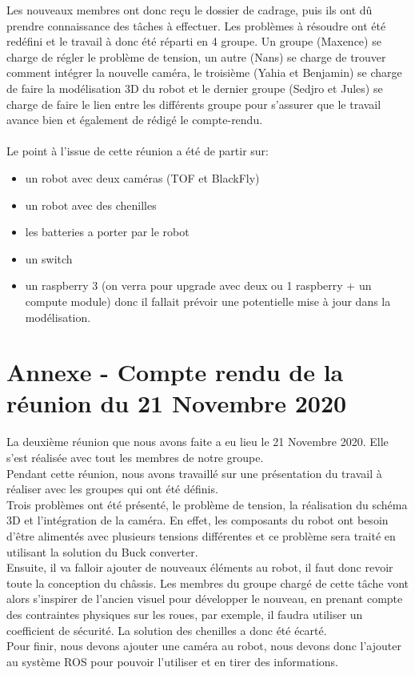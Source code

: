 \documentclass{PackagerQualityN}
\begin{document}
Les nouveaux membres ont donc reçu le dossier de cadrage, puis ils ont dû prendre connaissance des tâches à effectuer. Les problèmes à résoudre ont été redéfini et le travail à donc été réparti en 4 groupe. Un groupe (Maxence) se charge de régler le problème de tension, un autre (Nans) se charge de trouver comment intégrer la nouvelle caméra, le troisième (Yahia et Benjamin) se charge de faire la modélisation 3D du robot et le dernier groupe (Sedjro et Jules) se charge de faire le lien entre les différents groupe pour s'assurer que le travail avance bien et également de rédigé le compte-rendu.
\\
\\
Le point à l'issue de cette réunion a été de partir sur:\\
\begin{itemize}
\item  un robot avec deux caméras (TOF et BlackFly)\\
\item   un robot avec des chenilles\\
\item  les batteries a porter par le robot\\
\item   un switch\\
\item   un raspberry 3 (on verra pour upgrade avec deux ou 1 raspberry + un compute module) donc il fallait prévoir une potentielle mise à jour dans la modélisation.
\end{itemize}

\newp
\section*{Annexe - Compte rendu de la réunion du 21 Novembre 2020}
La deuxième réunion que nous avons faite a eu lieu le 21 Novembre 2020. Elle s'est réalisée avec tout les membres de notre groupe.\\

Pendant cette réunion, nous avons travaillé sur une présentation du travail à réaliser avec les groupes qui ont été définis.\\

Trois problèmes ont été présenté, le problème de tension, la réalisation du schéma 3D et l'intégration de la caméra.
En effet, les composants du robot ont besoin d’être alimentés avec plusieurs tensions différentes et ce problème sera traité en utilisant la solution du Buck converter.
\\
Ensuite, il va falloir ajouter de nouveaux éléments au robot, il faut donc revoir toute la conception du châssis.
Les membres du groupe chargé de cette tâche vont alors s’inspirer de l’ancien visuel pour développer le nouveau, en prenant compte des contraintes physiques sur les roues, par exemple, il faudra utiliser un coefficient de sécurité.
La solution des chenilles a donc été écarté.
\\
Pour finir, nous devons ajouter une caméra au robot, nous devons donc l’ajouter au système ROS pour pouvoir l’utiliser et en tirer des informations.
\\
\end{document}
